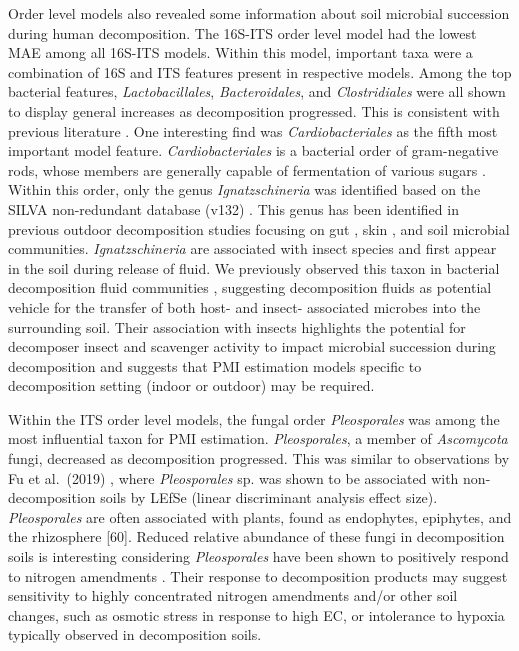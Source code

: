 \documentclass[
  10pt,
  letterpaper,
]{article}
\begin{document}
Order level models also revealed some information about soil microbial
succession during human decomposition. The 16S-ITS order level model had
the lowest MAE among all 16S-ITS models. Within this model, important
taxa were a combination of 16S and ITS features present in respective
models. Among the top bacterial features, \emph{Lactobacillales},
\emph{Bacteroidales}, and \emph{Clostridiales} were all shown to display
general increases as decomposition progressed. This is consistent with
previous literature \citep{cobaugh_functional_2015}. One interesting
find was \emph{Cardiobacteriales} as the fifth most important model
feature. \emph{Cardiobacteriales} is a bacterial order of gram-negative
rods, whose members are generally capable of fermentation of various
sugars \citep{garrity_order_2007}. Within this order, only the genus
\emph{Ignatzschineria} was identified based on the SILVA non-redundant
database (v132) \citep{quast_silva_2013}. This genus has been identified
in previous outdoor decomposition studies focusing on gut
\citep{debruyn_postmortem_2017}, skin \citep{hyde_initial_2015}, and
soil \citep{cobaugh_functional_2015} microbial communities.
\emph{Ignatzschineria} are associated with insect species
\citep{toth_proposal_2007, gupta_ignatzschineria_2011} and first appear
in the soil during release of fluid. We previously observed this taxon
in bacterial decomposition fluid communities \citep{mason_body_2022},
suggesting decomposition fluids as potential vehicle for the transfer of
both host- and insect- associated microbes into the surrounding soil.
Their association with insects highlights the potential for decomposer
insect and scavenger activity to impact microbial succession during
decomposition and suggests that PMI estimation models specific to
decomposition setting (indoor or outdoor) may be required.

Within the ITS order level models, the fungal order \emph{Pleosporales}
was among the most influential taxon for PMI estimation.
\emph{Pleosporales}, a member of \emph{Ascomycota} fungi, decreased as
decomposition progressed. This was similar to observations by Fu et
al.~(2019) \citep{fu_fungal_2019}, where \emph{Pleosporales} sp. was
shown to be associated with non-decomposition soils by LEfSe (linear
discriminant analysis effect size). \emph{Pleosporales} are often
associated with plants, found as endophytes, epiphytes, and the
rhizosphere {[}60{]}. Reduced relative abundance of these fungi in
decomposition soils is interesting considering \emph{Pleosporales} have
been shown to positively respond to nitrogen amendments
\citep{lowell_comparative_2001, she_resource_2018}. Their response to
decomposition products may suggest sensitivity to highly concentrated
nitrogen amendments and/or other soil changes, such as osmotic stress in
response to high EC, or intolerance to hypoxia typically observed in
decomposition soils.
\end{document}
